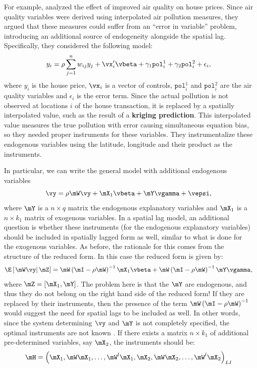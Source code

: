 \documentclass[english,12pt]{book}\usepackage[]{graphicx}\usepackage[]{xcolor}
\begin{document}
For example, \cite{anselin2008errors} analyzed the effect of improved air quality on house prices. Since air quality variables were derived using interpolated air pollution measures, they argued that these measures could suffer from an ``error in variable'' problem, introducing an additional source of endogeneity alongside the spatial lag. Specifically, they considered the following model:
\begin{equation*}
  y_i = \rho \sum_{j = 1}^nw_{ij}y_j + \vx_i'\vbeta + \gamma_1\texttt{pol}_i^1 + \gamma_2\texttt{pol}_i^2 + \epsilon_i, 
\end{equation*}
%
where $y_i$ is the house price,  $\vx_i$ is a vector of controls,  $\texttt{pol}_i^1$ and $\texttt{pol}_i^2$ are the air quality variables and $\epsilon_i$ is the error term. Since the actual pollution is not observed at locations $i$ of the house transaction, it is replaced by a spatially interpolated value, such as the result of a \textbf{kriging prediction}. This interpolated value measures the true pollution with error causing simultaneous equation bias, so they needed proper instruments for these variables. They instrumentalize these endogenous variables using the latitude, longitude and their product as the instruments. 

In particular, we can write the general model with additional endogenous variables
\begin{equation*}
  \vy = \rho\mW\vy + \mX_1\vbeta + \mY\vgamma + \vepsi,
\end{equation*}
%
where $\mY$ is a $n\times q$ matrix the endogenous explanatory variables and $\mX_1$ is a $n\times k_1$ matrix of exogenous variables. In a spatial lag model, an additional question is whether these instruments (for the endogenous explanatory variables) should be included in spatially lagged form as well, similar to what is done for the exogenous variables. As before, the rationale for this comes from the structure of the reduced form.  In this case the reduced form is given by:
\begin{equation*}
\E\left[\left.\mW\vy\right|\mZ\right] = \mW\left(\mI - \rho\mW\right)^{-1}\mX_1\vbeta + \mW\left(\mI - \rho\mW\right)^{-1}\mY\vgamma,
\end{equation*}
%
where $\mZ = \left[\mX_1, \mY\right]$. The problem here is that the $\mY$ are endogenous, and thus they do not belong on the right hand side of the reduced form!  If they are replaced by their instruments, then the presence of the term $\mW\left(\mI - \rho\mW\right)^{-1}$ would suggest the need for spatial lags to be included as well. In other words, since the system determining $\vy$ and $\mY$ is not completely specified, the optimal instruments are not known \citep{spdep}. If there exists a matrix $n \times k_1$ of additional pre-determined variables, say $\mX_2$, the instruments should be:
\begin{equation}
\mH = \left(\mX_1, \mW\mX_1, \ldots, \mW^l\mX_1, \mX_2, \mW\mX_2, \ldots, \mW^l\mX_2\right)_{LI}
\end{equation}
\end{document}
